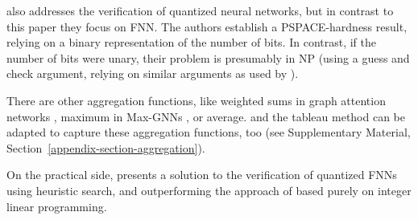 \citet{HenzingerLZ21} also addresses the verification of quantized neural networks, but in contrast to this paper they focus on FNN. The authors establish a PSPACE-hardness result, relying on a binary representation of the number of bits. In contrast, if the number of bits were unary, their problem is presumably in NP (using a guess and check argument, relying on similar arguments as used by \cite{SalzerL21}).

There are other aggregation functions, like weighted sums in graph attention networks \cite{DBLP:conf/iclr/VelickovicCCRLB18}, maximum in Max-GNNs \cite{DBLP:conf/kr/CucalaG24}, or average. \thelogic{} and the tableau method can be adapted to capture these aggregation functions, too (see Supplementary Material, Section~\ref{appendix-section-aggregation}). 

On the practical side, \citet{DBLP:conf/aaai/000200DWZB24} presents a solution to the verification of quantized FNNs using heuristic search, and outperforming the approach of \citet{10.1145/3551349.3556916} based purely on integer linear programming.